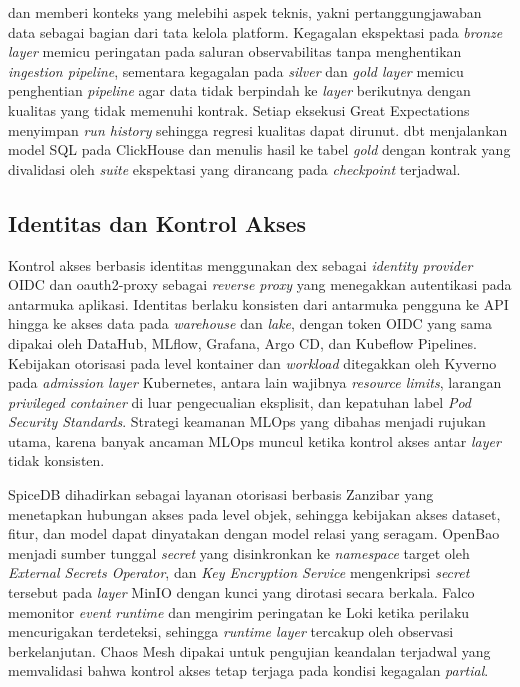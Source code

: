 \textcite{bernardo2024data} dan \textcite{stoyanovich2020responsible} memberi konteks yang melebihi aspek teknis, yakni pertanggungjawaban data sebagai bagian dari tata kelola platform. Kegagalan ekspektasi pada \textit{bronze layer} memicu peringatan pada saluran observabilitas tanpa menghentikan \textit{ingestion pipeline}, sementara kegagalan pada \textit{silver} dan \textit{gold layer} memicu penghentian \textit{pipeline} agar data tidak berpindah ke \textit{layer} berikutnya dengan kualitas yang tidak memenuhi kontrak. Setiap eksekusi Great Expectations menyimpan \textit{run history} sehingga regresi kualitas dapat dirunut. dbt menjalankan model SQL pada ClickHouse dan menulis hasil ke tabel \textit{gold} dengan kontrak yang divalidasi oleh \textit{suite} ekspektasi yang dirancang pada \textit{checkpoint} terjadwal.

\subsection{Identitas dan Kontrol Akses}
\label{subsec:identitas-akses}

Kontrol akses berbasis identitas menggunakan dex \autocite{dex2025} sebagai \textit{identity provider} OIDC dan oauth2-proxy \autocite{oauth2proxy2025} sebagai \textit{reverse proxy} yang menegakkan autentikasi pada antarmuka aplikasi. Identitas berlaku konsisten dari antarmuka pengguna ke API hingga ke akses data pada \textit{warehouse} dan \textit{lake}, dengan token OIDC yang sama dipakai oleh DataHub, MLflow, Grafana, Argo CD, dan Kubeflow Pipelines. Kebijakan otorisasi pada level kontainer dan \textit{workload} ditegakkan oleh Kyverno \autocite{kyverno2024} pada \textit{admission layer} Kubernetes, antara lain wajibnya \textit{resource limits}, larangan \textit{privileged container} di luar pengecualian eksplisit, dan kepatuhan label \textit{Pod Security Standards}. Strategi keamanan MLOps yang dibahas \textcite{ahmad2024mlops} menjadi rujukan utama, karena banyak ancaman MLOps muncul ketika kontrol akses antar \textit{layer} tidak konsisten.

SpiceDB \autocite{spicedb2025} dihadirkan sebagai layanan otorisasi berbasis Zanzibar yang menetapkan hubungan akses pada level objek, sehingga kebijakan akses dataset, fitur, dan model dapat dinyatakan dengan model relasi yang seragam. OpenBao menjadi sumber tunggal \textit{secret} yang disinkronkan ke \textit{namespace} target oleh \textit{External Secrets Operator}, dan \textit{Key Encryption Service} mengenkripsi \textit{secret} tersebut pada \textit{layer} MinIO dengan kunci yang dirotasi secara berkala. Falco \autocite{falco2025} memonitor \textit{event} \textit{runtime} dan mengirim peringatan ke Loki ketika perilaku mencurigakan terdeteksi, sehingga \textit{runtime layer} tercakup oleh observasi berkelanjutan. Chaos Mesh \autocite{chaosmesh2025} dipakai untuk pengujian keandalan terjadwal yang memvalidasi bahwa kontrol akses tetap terjaga pada kondisi kegagalan \textit{partial}.

